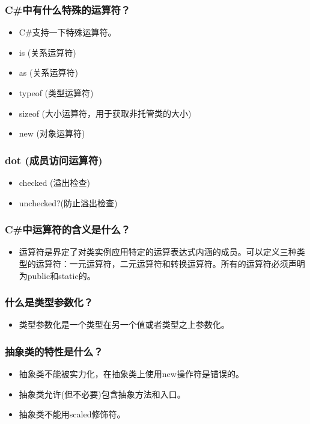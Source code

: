 \documentclass[9pt, b5paper]{article}
\begin{document}
\subsubsection{C\#中有什么特殊的运算符？}
\label{sec-1-2-16}
\begin{itemize}
\item C\#支持一下特殊运算符。
\item is (关系运算符)
\item as (关系运算符)
\item typeof (类型运算符)
\item sizeof (大小运算符，用于获取非托管类的大小)
\item new (对象运算符)
\end{itemize}
\subsubsection{dot (成员访问运算符)}
\label{sec-1-2-17}
\begin{itemize}
\item checked (溢出检查)
\item unchecked?(防止溢出检查)
\end{itemize}
\subsubsection{C\#中运算符的含义是什么？}
\label{sec-1-2-18}
\begin{itemize}
\item 运算符是界定了对类实例应用特定的运算表达式内涵的成员。可以定义三种类型的运算符：一元运算符，二元运算符和转换运算符。所有的运算符必须声明为public和static的。
\end{itemize}
\subsubsection{什么是类型参数化？}
\label{sec-1-2-19}
\begin{itemize}
\item 类型参数化是一个类型在另一个值或者类型之上参数化。
\end{itemize}
\subsubsection{抽象类的特性是什么？}
\label{sec-1-2-20}
\begin{itemize}
\item 抽象类不能被实力化，在抽象类上使用new操作符是错误的。
\item 抽象类允许(但不必要)包含抽象方法和入口。
\item 抽象类不能用scaled修饰符。
\end{itemize}
\end{document}
